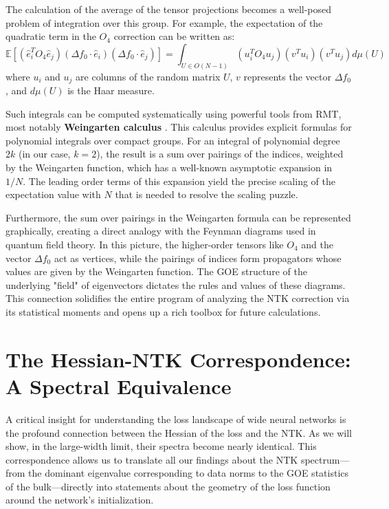 \documentclass{article}
\begin{document}
The calculation of the average of the tensor projections becomes a well-posed problem of integration over this group. For example, the expectation of the quadratic term in the $O_4$ correction can be written as:
\begin{equation}
\mathbb{E}[(\hat{e}_{i}^{T}O_{4}\hat{e}_{j})(\Delta f_{0}\cdot \hat{e}_{i})(\Delta f_{0}\cdot \hat{e}_{j})] = \int_{U \in O(N-1)} (u_i^T O_4 u_j) (v^T u_i) (v^T u_j) d\mu(U)
\end{equation}
where $u_i$ and $u_j$ are columns of the random matrix $U$, $v$ represents the vector $\Delta f_0$, and $d\mu(U)$ is the Haar measure.

Such integrals can be computed systematically using powerful tools from RMT, most notably \textbf{Weingarten calculus} \cite{collins2022weingarten}. This calculus provides explicit formulas for polynomial integrals over compact groups. For an integral of polynomial degree $2k$ (in our case, $k=2$), the result is a sum over pairings of the indices, weighted by the Weingarten function, which has a well-known asymptotic expansion in $1/N$. The leading order terms of this expansion yield the precise scaling of the expectation value with $N$ that is needed to resolve the scaling puzzle.

Furthermore, the sum over pairings in the Weingarten formula can be represented graphically, creating a direct analogy with the Feynman diagrams used in quantum field theory. In this picture, the higher-order tensors like $O_4$ and the vector $\Delta f_0$ act as vertices, while the pairings of indices form propagators whose values are given by the Weingarten function. The GOE structure of the underlying "field" of eigenvectors dictates the rules and values of these diagrams. This connection solidifies the entire program of analyzing the NTK correction via its statistical moments and opens up a rich toolbox for future calculations.

\newpage
\section{The Hessian-NTK Correspondence: A Spectral Equivalence}

A critical insight for understanding the loss landscape of wide neural networks is the profound connection between the Hessian of the loss and the NTK. As we will show, in the large-width limit, their spectra become nearly identical. This correspondence allows us to translate all our findings about the NTK spectrum—from the dominant eigenvalue corresponding to data norms to the GOE statistics of the bulk—directly into statements about the geometry of the loss function around the network's initialization.
\end{document}

